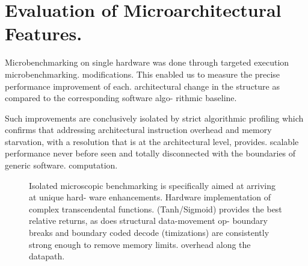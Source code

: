 \section{Evaluation of Microarchitectural Features.}
Microbenchmarking on single hardware was done through targeted execution microbenchmarking. modifications. This enabled us to measure the precise performance improvement of each. architectural change in the structure as compared to the corresponding software algo- rithmic baseline.

Such improvements are conclusively isolated by strict algorithmic profiling which confirms that addressing architectural instruction overhead and memory starvation, with a resolution that is at the architectural level, provides. scalable performance never before seen and totally disconnected with the boundaries of generic software. computation.

\begin{figure}[htbp]
    \centering
    \vspace{0.2cm}
    \caption{Isolated microscopic benchmarking is specifically aimed at arriving at unique hard- ware enhancements. Hardware implementation of complex transcendental functions. (Tanh/Sigmoid) provides the best relative returns, as does structural data-movement op- boundary breaks and boundary coded decode (timizations) are consistently strong enough to remove memory limits. overhead along the datapath.}
    \label{fig:feature_speedup}
\end{figure}
